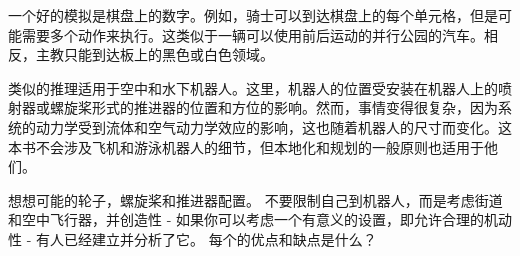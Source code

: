 
一个好的模拟是棋盘上的数字。例如，骑士可以到达棋盘上的每个单元格，但是可能需要多个动作来执行。这类似于一辆可以使用前后运动的并行公园的汽车。相反，主教只能到达板上的黑色或白色领域。


类似的推理适用于空中和水下机器人。这里，机器人的位置受安装在机器人上的喷射器或螺旋桨形式的推进器的位置和方位的影响。然而，事情变得很复杂，因为系统的动力学受到流体和空气动力学效应的影响，这也随着机器人的尺寸而变化。这本书不会涉及飞机和游泳机器人的细节，但本地化和规划的一般原则也适用于他们。

\begin{framed}
想想可能的轮子，螺旋桨和推进器配置。 不要限制自己到机器人，而是考虑街道和空中飞行器，并创造性 - 如果你可以考虑一个有意义的设置，即允许合理的机动性 - 有人已经建立并分析了它。 每个的优点和缺点是什么？
\end{framed}


